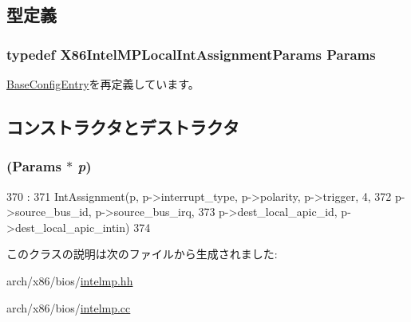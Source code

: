\subsection{型定義}
\hypertarget{classX86ISA_1_1IntelMP_1_1LocalIntAssignment_a90695805b2535036d63fbf5101dc4849}{
\subsubsection[{Params}]{\setlength{\rightskip}{0pt plus 5cm}typedef X86IntelMPLocalIntAssignmentParams {\bf Params}}}
\label{classX86ISA_1_1IntelMP_1_1LocalIntAssignment_a90695805b2535036d63fbf5101dc4849}


\hyperlink{classX86ISA_1_1IntelMP_1_1BaseConfigEntry_a94814126eb2e681fbf4837ed24d18616}{BaseConfigEntry}を再定義しています。

\subsection{コンストラクタとデストラクタ}
\hypertarget{classX86ISA_1_1IntelMP_1_1LocalIntAssignment_ac4ae67c3066d56b8651343de4db4bcf0}{
\subsubsection[{LocalIntAssignment}]{ ({\bf Params} $\ast$ {\em p})}}
\label{classX86ISA_1_1IntelMP_1_1LocalIntAssignment_ac4ae67c3066d56b8651343de4db4bcf0}



\begin{DoxyCode}
370                                                               :
371     IntAssignment(p, p->interrupt_type, p->polarity, p->trigger, 4,
372             p->source_bus_id, p->source_bus_irq,
373             p->dest_local_apic_id, p->dest_local_apic_intin)
374 {}

\end{DoxyCode}


このクラスの説明は次のファイルから生成されました:\begin{DoxyCompactItemize}
\item 
arch/x86/bios/\hyperlink{intelmp_8hh}{intelmp.hh}\item 
arch/x86/bios/\hyperlink{intelmp_8cc}{intelmp.cc}\end{DoxyCompactItemize}
